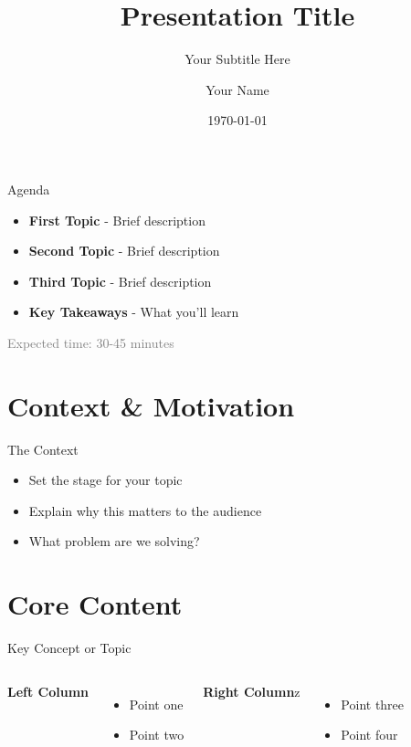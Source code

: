 \documentclass[aspectratio=169, xcolor=table]{beamer}
\title{Presentation Title}
\subtitle{Your Subtitle Here}
\author{Your Name}
\date{\today}
\begin{document}
\begin{frame}[plain]
	\titlepage
\end{frame}

\begin{frame}{Agenda}
	\begin{itemize}
		\item \textbf{First Topic} - Brief description
		\item \textbf{Second Topic} - Brief description
		\item \textbf{Third Topic} - Brief description
		\item \textbf{Key Takeaways} - What you'll learn
	\end{itemize}
	\vspace{1em}
	{\small \textcolor{gray}{Expected time: 30-45 minutes}}
\end{frame}



\section{Context \& Motivation}

\begin{frame}{The Context}
	\begin{itemize}
		\item Set the stage for your topic
		\item Explain why this matters to the audience
		\item What problem are we solving?
	\end{itemize}
\end{frame}

\section{Core Content}

\begin{frame}{Key Concept or Topic}
	\begin{columns}[T]
		\textbf{Left Column}
		\begin{itemize}
			\item Point one
			\item Point two
		\end{itemize}

		\textbf{Right Column}z
		\begin{itemize}
			\item Point three
			\item Point four
		\end{itemize}
	\end{columns}
\end{frame}
\end{document}
